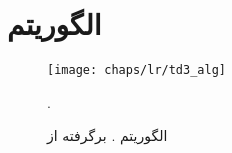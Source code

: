 
\chapter{الگوریتم }

\begin{figure}[!ht]
	\centerline{\texttt{[image: chaps/lr/td3\_alg]}}
	\caption{الگوریتم  \cite{fujimoto2018addressing}. برگرفته از }.
	\label{fig:ch_lr:td3_alg}
\end{figure} 
